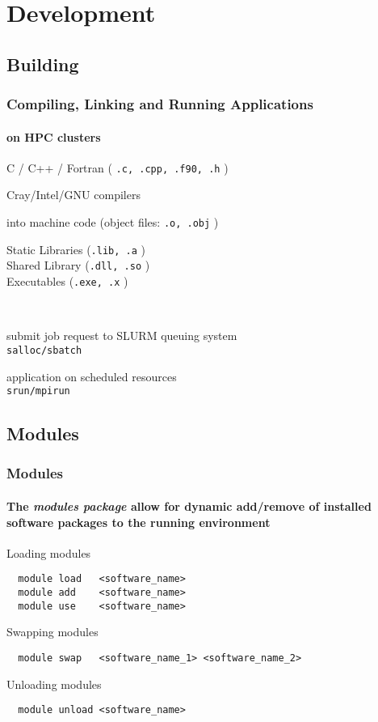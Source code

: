 \section{Development}
\subsection{Building}
\begin{frame}[fragile]
\frametitle{Compiling, Linking and Running Applications}
\framesubtitle{on HPC clusters}
 \begin{description}
    \item [source code] C / C++ / Fortran ( \verb|.c, .cpp, .f90, .h|  )
    \item [compile] Cray/Intel/GNU compilers
    \item [assemble] into machine code (object files: \verb|.o, .obj| )
    \item [link] Static Libraries (\verb|.lib, .a|  ) \\ Shared Library (\verb|.dll, .so| ) \\ Executables (\verb|.exe, .x| )
    \item ~ 
    \item [request allocation] submit job request to SLURM queuing system \\ \verb|salloc/sbatch|
    \item [run] application on scheduled resources \\ \verb|srun/mpirun|
 \end{description}
\end{frame}

\subsection{Modules}
\begin{frame}[fragile]
\frametitle{Modules}
\framesubtitle{The \textit{modules package} allow for dynamic add/remove of installed software packages to the running environment}

\begin{exampleblock}{Loading modules}
  \begin{verbatim}
  module load 	<software_name>
  module add 	<software_name>
  module use 	<software_name>
  \end{verbatim}
\end{exampleblock}

\begin{exampleblock}{Swapping modules}
  \begin{verbatim}
  module swap 	<software_name_1> <software_name_2>
  \end{verbatim}
\end{exampleblock}

\begin{exampleblock}{Unloading modules}
  \begin{verbatim}
  module unload <software_name>
  \end{verbatim}
\end{exampleblock}
\end{frame}


